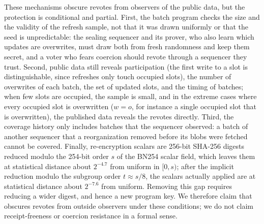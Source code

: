 These mechanisms obscure revotes from observers of the public data, but the protection is conditional and partial. First, the batch program checks the size and the validity of the refresh sample, not that it was drawn uniformly or that the seed is unpredictable: the sealing sequencer and its prover, who also learn which updates are overwrites, must draw both from fresh randomness and keep them secret, and a voter who fears coercion should revote through a sequencer they trust. Second, public data still reveals participation (the first write to a slot is distinguishable, since refreshes only touch occupied slots), the number of overwrites of each batch, the set of updated slots, and the timing of batches; when few slots are occupied, the sample is small, and in the extreme cases where every occupied slot is overwritten ($w = o$, for instance a single occupied slot that is overwritten), the published data reveals the revotes directly. Third, the coverage history only includes batches that the sequencer observed: a batch of another sequencer that a reorganization removed before its blobs were fetched cannot be covered. Finally, re-encryption scalars are 256-bit SHA-256 digests reduced modulo the 254-bit order $s$ of the BN254 scalar field, which leaves them at statistical distance about $2^{-4.7}$ from uniform in $[0, s)$; after the implicit reduction modulo the subgroup order $t \approx s/8$, the scalars actually applied are at statistical distance about $2^{-7.6}$ from uniform. Removing this gap requires reducing a wider digest, and hence a new program key. We therefore claim that \davinci obscures revotes from outside observers under these conditions; we do not claim receipt-freeness or coercion resistance in a formal sense.

